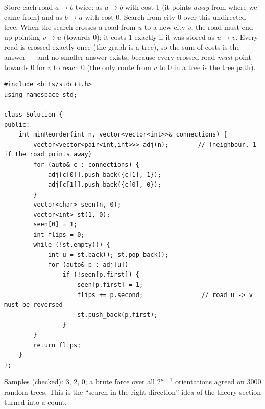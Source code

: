 \begin{solutionbox}
Store each road $a \to b$ twice: as $a \to b$ with cost 1 (it points \emph{away} from where we came from) and as $b \to a$ with cost 0. Search from city 0 over this undirected tree. When the search crosses a road from $u$ to a new city $v$, the road must end up pointing $v \to u$ (towards 0); it costs 1 exactly if it was stored as $u \to v$. Every road is crossed exactly once (the graph is a tree), so the sum of costs is the answer --- and no smaller answer exists, because every crossed road \emph{must} point towards 0 for $v$ to reach 0 (the only route from $v$ to 0 in a tree is the tree path).
\begin{lstlisting}[style=cpp]
#include <bits/stdc++.h>
using namespace std;

class Solution {
public:
    int minReorder(int n, vector<vector<int>>& connections) {
        vector<vector<pair<int,int>>> adj(n);        // (neighbour, 1 if the road points away)
        for (auto& c : connections) {
            adj[c[0]].push_back({c[1], 1});
            adj[c[1]].push_back({c[0], 0});
        }
        vector<char> seen(n, 0);
        vector<int> st(1, 0);
        seen[0] = 1;
        int flips = 0;
        while (!st.empty()) {
            int u = st.back(); st.pop_back();
            for (auto& p : adj[u])
                if (!seen[p.first]) {
                    seen[p.first] = 1;
                    flips += p.second;                // road u -> v must be reversed
                    st.push_back(p.first);
                }
        }
        return flips;
    }
};
\end{lstlisting}
\begin{center}
\end{center}
Samples (checked): $3$, $2$, $0$; a brute force over all $2^{n-1}$ orientations agreed on 3000 random trees. This is the ``search in the right direction'' idea of the theory section turned into a count.
\end{solutionbox}

